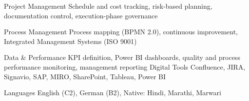 

\begin{cvskills}

  

    
  \cvskill
    {Project Management} %
    {Schedule and cost tracking, risk-based planning, documentation control, execution-phase governance} %

  \cvskill
    {Process Management} %
    {Process mapping (BPMN 2.0), continuous improvement, Integrated Management Systems (ISO 9001)} %

  \cvskill
    {Data \& Performance} %
    {KPI definition, Power BI dashboards, quality and process performance monitoring, management reporting} %
  \cvskill
    {Digital Tools} %
    {Confluence, JIRA, Signavio, SAP, MIRO, SharePoint, Tableau, Power BI} %

  \cvskill
    {Languages} %
    {English (C2), German (B2), Native: Hindi, Marathi, Marwari} %

\end{cvskills}